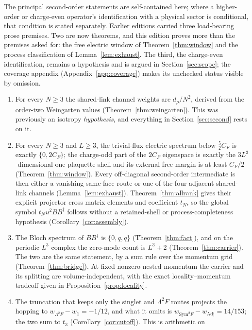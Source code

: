 \documentclass[11pt]{article}
\theoremstyle{plain}
\theoremstyle{definition}
\theoremstyle{remark}
\newcommand{\CF}{C_F}
\newcommand{\dg}{^{\dagger}}
\begin{document}
The principal second-order statements are self-contained here; where a
higher-order or charge-even operator's identification with a physical sector
is conditional, that condition is stated separately. Earlier editions carried
three load-bearing prose premises. Two are now theorems, and this edition
proves more than the premises asked for: the free electric window of
Theorem~\ref{thm:window} and the process classification of
Lemma~\ref{lem:exhaust}. The third, the charge-even identification, remains a
hypothesis and is argued in Section~\ref{sec:scope}; the coverage appendix
(Appendix~\ref{app:coverage}) makes its unchecked status visible by omission.

\begin{enumerate}\itemsep2pt
\item For every $N\ge3$ the shared-link channel weights are $d_\rho/N^2$,
  derived from the order-two Weingarten values
  (Theorem~\ref{thm:weingarten}). This was previously an isotropy
  \emph{hypothesis}, and everything in Section~\ref{sec:second} rests on it.
\item For every $N\ge3$ and $L\ge3$, the trivial-flux electric spectrum below
  $\tfrac52\CF$ is exactly $\{0,2\CF\}$; the charge-odd part of the $2\CF$
  eigenspace is exactly the $3L^3$-dimensional one-plaquette shell and its
  external free margin is at least $\CF/2$ (Theorem~\ref{thm:window}). Every
  off-diagonal second-order intermediate is then either a vanishing same-face
  route or one of the four adjacent shared-link channels
  (Lemma~\ref{lem:exhaust}). Theorem~\ref{thm:allrank} gives their explicit
  projector cross matrix elements and coefficient $t_N$, so the global symbol
  $t_Nu^2BB\dg$ follows without a retained-shell or process-completeness
  hypothesis (Corollary~\ref{cor:assembly}).
\item The Bloch spectrum of $BB\dg$ is $\{0,q,q\}$ (Theorem~\ref{thm:fact}),
  and on the periodic $L^3$ complex the zero-mode count is $L^3+2$
  (Theorem~\ref{thm:carrier}). The two are the same statement, by a sum rule
  over the momentum grid (Theorem~\ref{thm:bridge}). At fixed nonzero nested
  momentum the carrier and its splitting are volume-independent, with the
  exact locality--momentum tradeoff given in Proposition~\ref{prop:locality}.
\item\label{item:cutoff} The truncation that keeps only the singlet and $\Lambda^2F$ routes
  projects the hopping to $w_{\Lambda^2F}-w_{\mathbf 1}=-1/12$, and what it
  omits is $w_{\mathrm{Sym}^2F}-w_{\mathrm{Adj}}=14/153$; the two sum to
  $t_3$ (Corollary~\ref{cor:cutoff}). This is arithmetic on

\end{enumerate}
\end{document}
